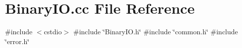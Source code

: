 \section{Binary\+I\+O.\+cc File Reference}
\label{BinaryIO_8cc}
{\ttfamily \#include $<$cstdio$>$}\newline
{\ttfamily \#include \char`\"{}Binary\+I\+O.\+h\char`\"{}}\newline
{\ttfamily \#include \char`\"{}common.\+h\char`\"{}}\newline
{\ttfamily \#include \char`\"{}error.\+h\char`\"{}}\newline
